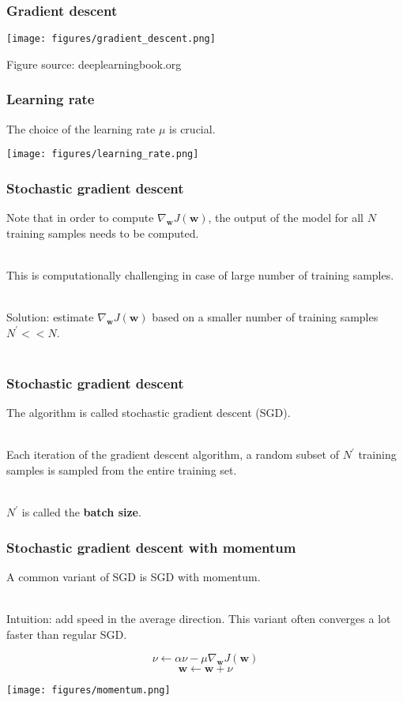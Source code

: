 \documentclass[notes]{beamer}          %
\begin{document}
\begin{frame}
\frametitle{Gradient descent}
\begin{center}
\texttt{[image: figures/gradient\_descent.png]} \\
\end{center}
\vfill
\tiny{Figure source: deeplearningbook.org}
\end{frame}


\begin{frame}
\frametitle{Learning rate}
The choice of the learning rate $\mu$ is crucial. 
\begin{center}
\texttt{[image: figures/learning\_rate.png]} \\
\end{center}
\end{frame}

\begin{frame}
\frametitle{Stochastic gradient descent}
Note that in order to compute $\nabla_\mathbf{w} J(\mathbf{w})$, the output of the model for all $N$ training samples needs to be computed. \\~\

This is computationally challenging in case of large number of training samples. \\~\

Solution: estimate $\nabla_\mathbf{w} J(\mathbf{w})$ based on a smaller number of training samples $N^\prime << N$. \\~\

\end{frame}


\begin{frame}
\frametitle{Stochastic gradient descent}
The algorithm is called stochastic gradient descent (SGD). \\~\

Each iteration of the gradient descent algorithm, a random subset of $N^\prime$ training samples is sampled from the entire training set. \\~\

$N^\prime$ is called the \textbf{batch size}. 

\end{frame}


\begin{frame}
\frametitle{Stochastic gradient descent with momentum}
A common variant of SGD is SGD with momentum.\\~\

Intuition: add speed in the average direction. This variant often converges a lot faster than regular SGD. 

$$ \nu \leftarrow \alpha \nu - \mu \nabla_\mathbf{w} J(\mathbf{w}) $$
$$ \mathbf{w} \leftarrow \mathbf{w} + \nu$$

\begin{center}
\texttt{[image: figures/momentum.png]} \\
\end{center}

\end{frame}
\end{document}
